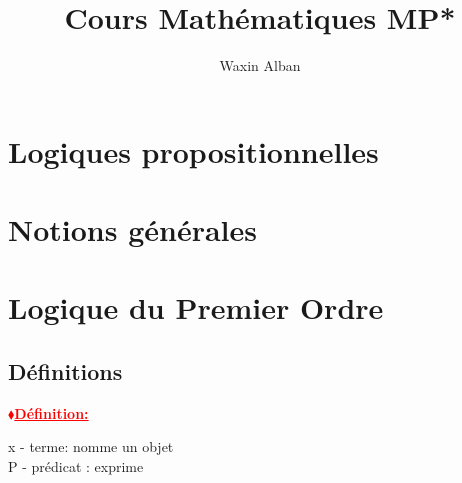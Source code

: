 \documentclass[12pt]{report}
\title{Cours Mathématiques MP*}
\author{Waxin Alban}
\newcommand{\rd}[1]{\textcolor{red}{#1}}
\newcommand{\blz}{$\blacklozenge$}
\newcommand{\defis}[1]
{
\begin{mybox}
\textbf{\rd{\underline{\blz Définition:} #1}}
\vspace{0.5cm}
\newline
}
\newcommand{\defie}
{
\end{mybox}
}
\begin{document}
\chapter{Logiques propositionnelles}
\chapter{ Notions générales}
\chapter{Logique du Premier Ordre}
\section{Définitions}

\defis{}
x - terme: nomme un objet\\
P - prédicat : exprime 
\defie
\end{document}

